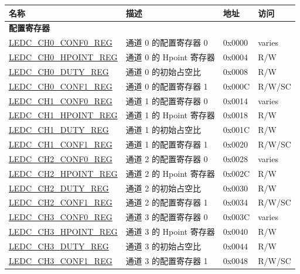 \begin{longtable}{ | p{5.5cm} | p{6.8cm} | p{1.3cm} | p{2cm} | }
\hline\rowcolor{lightgray}
名称 & 描述 &  地址 & 访问 \\ \hline
\endhead
\multicolumn{4}{|l|}{\textbf{配置寄存器}} \\ \hline
\hyperref[regdesc:LEDCCHNCONF0REG]{LEDC\_CH0\_CONF0\_REG} & 通道 0 的配置寄存器 0 & 0x0000 & varies \\ \hline
\hyperref[regdesc:LEDCCHNHPOINTREG]{LEDC\_CH0\_HPOINT\_REG} & 通道 0 的 Hpoint 寄存器 & 0x0004 & R/W \\ \hline
\hyperref[regdesc:LEDCCHNDUTYREG]{LEDC\_CH0\_DUTY\_REG} & 通道 0 的初始占空比 & 0x0008 & R/W \\ \hline
\hyperref[regdesc:LEDCCHNCONF1REG]{LEDC\_CH0\_CONF1\_REG} & 通道 0 的配置寄存器 1 & 0x000C & R/W/SC \\ \hline
\hyperref[regdesc:LEDCCHNCONF0REG]{LEDC\_CH1\_CONF0\_REG} & 通道 1 的配置寄存器 0 & 0x0014 & varies \\ \hline
\hyperref[regdesc:LEDCCHNHPOINTREG]{LEDC\_CH1\_HPOINT\_REG} & 通道 1 的 Hpoint 寄存器 & 0x0018 & R/W \\ \hline
\hyperref[regdesc:LEDCCHNDUTYREG]{LEDC\_CH1\_DUTY\_REG} & 通道 1 的初始占空比 & 0x001C & R/W \\ \hline
\hyperref[regdesc:LEDCCHNCONF1REG]{LEDC\_CH1\_CONF1\_REG} & 通道 1 的配置寄存器 1 & 0x0020 & R/W/SC \\ \hline
\hyperref[regdesc:LEDCCHNCONF0REG]{LEDC\_CH2\_CONF0\_REG} & 通道 2 的配置寄存器 0 & 0x0028 & varies \\ \hline
\hyperref[regdesc:LEDCCHNHPOINTREG]{LEDC\_CH2\_HPOINT\_REG} & 通道 2 的 Hpoint 寄存器 & 0x002C & R/W \\ \hline
\hyperref[regdesc:LEDCCHNDUTYREG]{LEDC\_CH2\_DUTY\_REG} & 通道 2 的初始占空比 & 0x0030 & R/W \\ \hline
\hyperref[regdesc:LEDCCHNCONF1REG]{LEDC\_CH2\_CONF1\_REG} & 通道 2 的配置寄存器 1 & 0x0034 & R/W/SC \\ \hline
\hyperref[regdesc:LEDCCHNCONF0REG]{LEDC\_CH3\_CONF0\_REG} & 通道 3 的配置寄存器 0 & 0x003C & varies \\ \hline
\hyperref[regdesc:LEDCCHNHPOINTREG]{LEDC\_CH3\_HPOINT\_REG} & 通道 3 的 Hpoint 寄存器 & 0x0040 & R/W \\ \hline
\hyperref[regdesc:LEDCCHNDUTYREG]{LEDC\_CH3\_DUTY\_REG} & 通道 3 的初始占空比 & 0x0044 & R/W \\ \hline
\hyperref[regdesc:LEDCCHNCONF1REG]{LEDC\_CH3\_CONF1\_REG} & 通道 3 的配置寄存器 1 & 0x0048 & R/W/SC \\ \hline

\end{longtable}
